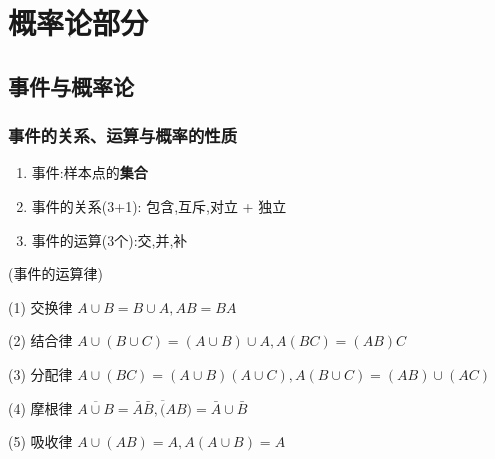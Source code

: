 \documentclass[12pt, a4paper, oneside, UTF8]{ctexbook}
\begin{document}
% 
\else
\fi

\chapter{概率论部分}

\section{事件与概率论}
\subsection{事件的关系、运算与概率的性质}
\begin{enumerate}
    \item 事件:样本点的\textbf{集合} 
    \item 事件的关系(3+1): 包含,互斥,对立 + 独立 
    \item 事件的运算(3个):交,并,补 
\end{enumerate}
\begin{remark}(事件的运算律)
    \item [(1)]\quad 交换律 \qquad $A\cup B = B\cup A, AB=BA$
    \item [(2)]\quad 结合律 \qquad $A\cup(B\cup C)=(A\cup B)\cup A, A(BC)=(AB)C$
    \item [(3)]\quad 分配律 \qquad $A\cup(BC)=(A\cup B)(A\cup C), A(B\cup C)=(AB)\cup(AC)$
    \item [(4)]\quad 摩根律 \qquad $\overline{A\cup B}=\bar{A}\bar{B},\overline(AB)=\bar{A}\cup\bar{B}$
    \item [(5)]\quad 吸收律 \qquad $A\cup(AB)=A,A(A\cup B)=A$
\end{remark}
\end{document}
